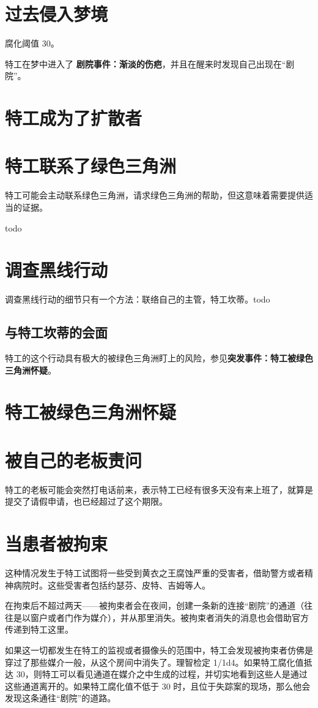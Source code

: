 \section{过去侵入梦境}

腐化阈值 30。

特工在梦中进入了 \textbf{剧院事件：渐淡的伤疤}，并且在醒来时发现自己出现在“剧院”。

\section{特工成为了扩散者}

\section{特工联系了绿色三角洲}
特工可能会主动联系绿色三角洲，请求绿色三角洲的帮助，但这意味着需要提供适当的证据。

todo

\section{调查黑线行动}

调查黑线行动的细节只有一个方法：联络自己的主管，特工坎蒂。todo

\subsection{与特工坎蒂的会面}

特工的这个行动具有极大的被绿色三角洲盯上的风险，参见\textbf{突发事件：特工被绿色三角洲怀疑}。

\section{特工被绿色三角洲怀疑}


\section{被自己的老板责问}
特工的老板可能会突然打电话前来，表示特工已经有很多天没有来上班了，就算是提交了请假申请，也已经超过了这个期限。

\section{当患者被拘束}

这种情况发生于特工试图将一些受到黄衣之王腐蚀严重的受害者，借助警方或者精神病院时。这些受害者包括约瑟芬、皮特、吉姆等人。

在拘束后不超过两天——被拘束者会在夜间，创建一条新的连接“剧院”的通道（往往是以窗户或者门作为媒介），并从那里消失。被拘束者消失的消息也会借助官方传递到特工这里。

如果这一切都发生在特工的监视或者摄像头的范围中，特工会发现被拘束者仿佛是穿过了那些媒介一般，从这个房间中消失了。理智检定 1/1d4。如果特工腐化值抵达 30，则特工可以看见通道在媒介之中生成的过程，并切实地看到这些人是通过这些通道离开的。如果特工腐化值不低于 30 时，且位于失踪案的现场，那么他会发现这条通往“剧院”的道路。